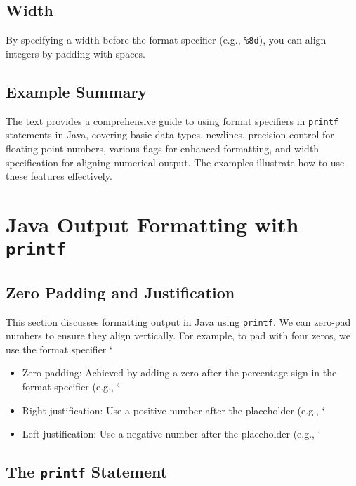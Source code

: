 \documentclass{article}
\begin{document}
\subsection{Width}

By specifying a width before the format specifier (e.g., \texttt{\%8d}), you can align integers by padding with spaces.


\subsection{Example Summary}

The text provides a comprehensive guide to using format specifiers in \texttt{printf} statements in Java, covering basic data types, newlines, precision control for floating-point numbers, various flags for enhanced formatting, and width specification for aligning numerical output.  The examples illustrate how to use these features effectively.


\section{Java Output Formatting with \texttt{printf}}

\subsection{Zero Padding and Justification}

This section discusses formatting output in Java using \texttt{printf}.  We can zero-pad numbers to ensure they align vertically.  For example, to pad with four zeros, we use the format specifier `%

\begin{itemize}
    \item Zero padding:  Achieved by adding a zero after the percentage sign in the format specifier (e.g., `%
    \item Right justification: Use a positive number after the placeholder (e.g., `%
    \item Left justification: Use a negative number after the placeholder (e.g., `%
\end{itemize}


\subsection{The \texttt{printf} Statement}
\end{document}
